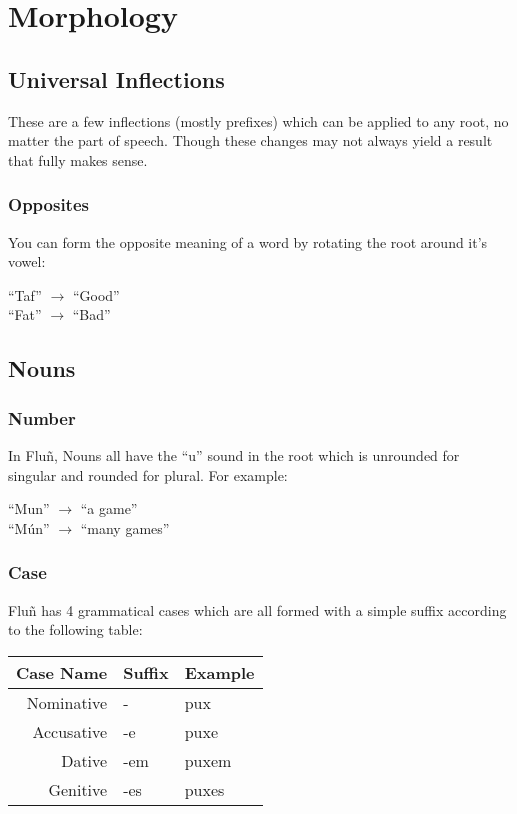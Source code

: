 \documentclass{book}
\begin{document}
\chapter{Morphology}
\section{Universal Inflections}
These are a few inflections (mostly prefixes) which can be applied to any root, no matter the
part of speech. Though these changes may not always yield a result that fully makes sense.

\subsection{Opposites}
You can form the opposite meaning of a word by rotating the root around it's vowel:

\begin{center}
    ``Taf'' $\rightarrow$ ``Good'' \\
    ``Fat'' $\rightarrow$ ``Bad''
\end{center}

\section{Nouns}
\subsection{Number}
In Fluñ, Nouns all have the ``u'' sound in the root which is unrounded for singular and rounded for plural.
For example:

\begin{center}
    ``Mun'' $\rightarrow$ ``a game'' \\
    ``Mún'' $\rightarrow$ ``many games''
\end{center}

\subsection{Case}
Fluñ has 4 grammatical cases which are all formed with a simple suffix according to the following table:

\begin{center}
    \begin{tabular}{|r|l|l|}
        \hline
        Case Name   & Suffix    & Example \\
        \hline
        Nominative  & -         & pux \\
        Accusative  & -e        & puxe \\
        Dative      & -em       & puxem \\
        Genitive    & -es       & puxes \\
        \hline
    \end{tabular}
\end{center}
\end{document}
